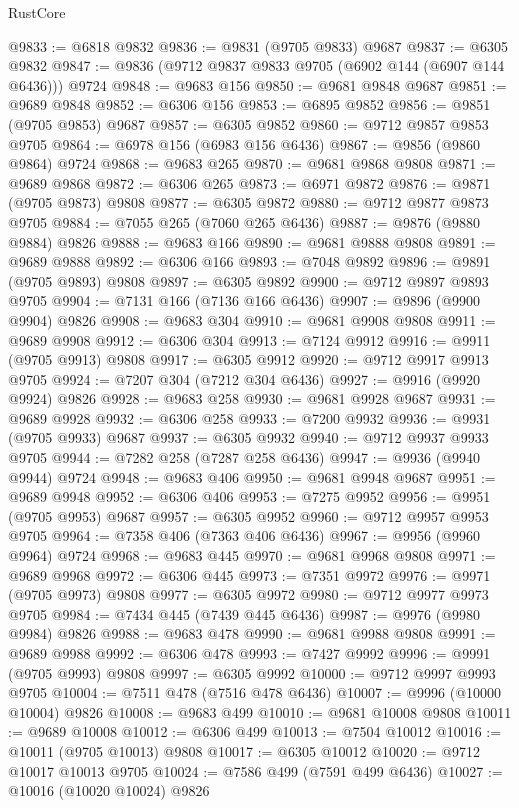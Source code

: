 \begin{lexlean}{RustCore}
\begin{coremodule}
@9833 := @6818 @9832
@9836 := @9831 (@9705 @9833) @9687
@9837 := @6305 @9832
@9847 := @9836 (@9712 @9837 @9833 @9705 (@6902 @144 (@6907 @144 @6436))) @9724
@9848 := @9683 @156
@9850 := @9681 @9848 @9687
@9851 := @9689 @9848
@9852 := @6306 @156
@9853 := @6895 @9852
@9856 := @9851 (@9705 @9853) @9687
@9857 := @6305 @9852
@9860 := @9712 @9857 @9853 @9705
@9864 := @6978 @156 (@6983 @156 @6436)
@9867 := @9856 (@9860 @9864) @9724
@9868 := @9683 @265
@9870 := @9681 @9868 @9808
@9871 := @9689 @9868
@9872 := @6306 @265
@9873 := @6971 @9872
@9876 := @9871 (@9705 @9873) @9808
@9877 := @6305 @9872
@9880 := @9712 @9877 @9873 @9705
@9884 := @7055 @265 (@7060 @265 @6436)
@9887 := @9876 (@9880 @9884) @9826
@9888 := @9683 @166
@9890 := @9681 @9888 @9808
@9891 := @9689 @9888
@9892 := @6306 @166
@9893 := @7048 @9892
@9896 := @9891 (@9705 @9893) @9808
@9897 := @6305 @9892
@9900 := @9712 @9897 @9893 @9705
@9904 := @7131 @166 (@7136 @166 @6436)
@9907 := @9896 (@9900 @9904) @9826
@9908 := @9683 @304
@9910 := @9681 @9908 @9808
@9911 := @9689 @9908
@9912 := @6306 @304
@9913 := @7124 @9912
@9916 := @9911 (@9705 @9913) @9808
@9917 := @6305 @9912
@9920 := @9712 @9917 @9913 @9705
@9924 := @7207 @304 (@7212 @304 @6436)
@9927 := @9916 (@9920 @9924) @9826
@9928 := @9683 @258
@9930 := @9681 @9928 @9687
@9931 := @9689 @9928
@9932 := @6306 @258
@9933 := @7200 @9932
@9936 := @9931 (@9705 @9933) @9687
@9937 := @6305 @9932
@9940 := @9712 @9937 @9933 @9705
@9944 := @7282 @258 (@7287 @258 @6436)
@9947 := @9936 (@9940 @9944) @9724
@9948 := @9683 @406
@9950 := @9681 @9948 @9687
@9951 := @9689 @9948
@9952 := @6306 @406
@9953 := @7275 @9952
@9956 := @9951 (@9705 @9953) @9687
@9957 := @6305 @9952
@9960 := @9712 @9957 @9953 @9705
@9964 := @7358 @406 (@7363 @406 @6436)
@9967 := @9956 (@9960 @9964) @9724
@9968 := @9683 @445
@9970 := @9681 @9968 @9808
@9971 := @9689 @9968
@9972 := @6306 @445
@9973 := @7351 @9972
@9976 := @9971 (@9705 @9973) @9808
@9977 := @6305 @9972
@9980 := @9712 @9977 @9973 @9705
@9984 := @7434 @445 (@7439 @445 @6436)
@9987 := @9976 (@9980 @9984) @9826
@9988 := @9683 @478
@9990 := @9681 @9988 @9808
@9991 := @9689 @9988
@9992 := @6306 @478
@9993 := @7427 @9992
@9996 := @9991 (@9705 @9993) @9808
@9997 := @6305 @9992
@10000 := @9712 @9997 @9993 @9705
@10004 := @7511 @478 (@7516 @478 @6436)
@10007 := @9996 (@10000 @10004) @9826
@10008 := @9683 @499
@10010 := @9681 @10008 @9808
@10011 := @9689 @10008
@10012 := @6306 @499
@10013 := @7504 @10012
@10016 := @10011 (@9705 @10013) @9808
@10017 := @6305 @10012
@10020 := @9712 @10017 @10013 @9705
@10024 := @7586 @499 (@7591 @499 @6436)
@10027 := @10016 (@10020 @10024) @9826

\end{coremodule}
\end{lexlean}
